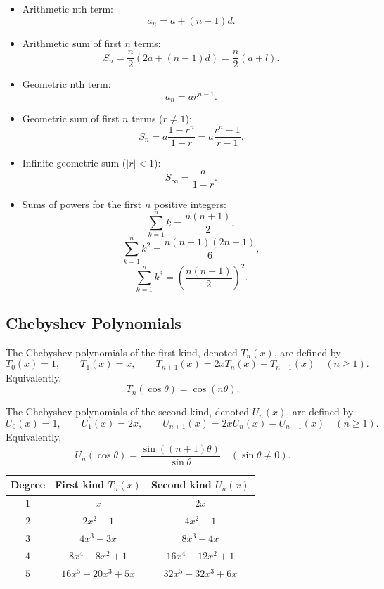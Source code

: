 \begin{itemize}[leftmargin=*]
  \item Arithmetic nth term:
  \[
a_n=a+(n-1)d.
\]
  \item Arithmetic sum of first $n$ terms:
  \[
S_n=\frac{n}{2}(2a+(n-1)d)=\frac{n}{2}(a+l).
\]
  \item Geometric nth term:
  \[
a_n=ar^{n-1}.
\]
  \item Geometric sum of first $n$ terms ($r\ne1$):
  \[
S_n=a\frac{1-r^n}{1-r}=a\frac{r^n-1}{r-1}.
\]
  \item Infinite geometric sum ($|r|<1$):
  \[
S_\infty=\frac{a}{1-r}.
\]
  \item Sums of powers for the first $n$ positive integers:
  \[
\sum_{k=1}^{n}k=\frac{n(n+1)}{2},
\]
\[
\sum_{k=1}^{n}k^2=\frac{n(n+1)(2n+1)}{6},
\]
\[
\sum_{k=1}^{n}k^3=\left(\frac{n(n+1)}{2}\right)^2.
\]
\end{itemize}

\subsection*{Chebyshev Polynomials}
The Chebyshev polynomials of the first kind, denoted $T_n(x)$, are defined by
\[
T_0(x)=1,\qquad T_1(x)=x,\qquad
T_{n+1}(x)=2xT_n(x)-T_{n-1}(x)\quad (n\ge 1).
\]
Equivalently,
\[
T_n(\cos\theta)=\cos(n\theta).
\]

The Chebyshev polynomials of the second kind, denoted $U_n(x)$, are defined by
\[
U_0(x)=1,\qquad U_1(x)=2x,\qquad
U_{n+1}(x)=2xU_n(x)-U_{n-1}(x)\quad (n\ge 1).
\]
Equivalently,
\[
U_n(\cos\theta)=\frac{\sin((n+1)\theta)}{\sin\theta}\quad (\sin\theta\ne 0).
\]

\begin{center}
\begin{tabular}{c|c|c}
\toprule
Degree & First kind $T_n(x)$ & Second kind $U_n(x)$ \\
\midrule
$1$ & $x$ & $2x$ \\
$2$ & $2x^2-1$ & $4x^2-1$ \\
$3$ & $4x^3-3x$ & $8x^3-4x$ \\
$4$ & $8x^4-8x^2+1$ & $16x^4-12x^2+1$ \\
$5$ & $16x^5-20x^3+5x$ & $32x^5-32x^3+6x$ \\
\bottomrule
\end{tabular}
\end{center}
